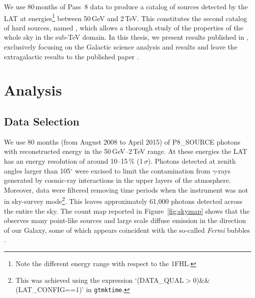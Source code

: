 We use 80\,months of Pass~8 data to produce a catalog of sources detected by the LAT at energies\footnote{Note the different energy range with respect to the 1FHL.} between 50\,GeV and 2\,TeV. This constitutes the second catalog of hard \lat{} sources, named \twofhl{}, which allows a thorough study of the properties of the whole sky in the sub-TeV domain. In this thesis, we present results published in \cite{2FHL}, exclusively focusing on the Galactic science analysis and results and leave the extragalactic results to the published \twofhl{} paper .


%
%
\section{Analysis}
\label{sec:analysis}


%
%

\subsection{\label{sec:data_sel}Data Selection}


We use 80 months (from August 2008 to April 2015) of P8\_SOURCE 
photons with reconstructed energy in the 50\,GeV--2\,TeV range.
At these energies the LAT has an energy resolution of around 10--15\,\% (1\,$\sigma$).
Photons detected at zenith angles larger than 105$^{\circ}$ were excised
to limit the contamination from $\gamma$-rays generated by cosmic-ray
interactions in the upper layers of the atmosphere. Moreover, data were filtered
removing time periods when the instrument was not in sky-survey mode\footnote{This
    was achieved using the expression `(DATA\_QUAL$>$0)\&\&(LAT\_CONFIG==1)' in {\tt gtmktime}.}.
This leaves
approximately 61,000 photons detected across the entire  the sky. The count map
reported in Figure~\ref{fig:skymap} shows that the \lat{} observes
many point-like sources and
large scale diffuse emission in the direction of our Galaxy, some of which appears
coincident  with the so-called {\it Fermi} bubbles \citep{su10,lat_bubbles}.



